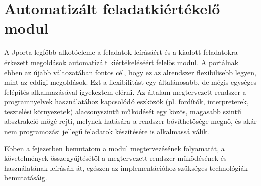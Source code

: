 \chapter{Automatizált feladatkiértékelő modul}\label{chapter:exercise}

A Jporta legfőbb alkotóeleme a feladatok leírásáért és a kiadott feladatokra érkezett megoldások automatizált kiértékeléséért felelős modul.
A portálnak ebben az újabb változatában fontos cél, hogy ez az alrendszer flexibilisebb legyen, mint az eddigi megoldások.
Ezt a flexibilitást egy általánosabb, de mégis egységes felépítés alkalmazásával igyekeztem elérni.
Az általam megtervezett rendszer a programnyelvek használatához kapcsolódó eszközök (pl. fordítók, interpreterek, tesztelési környezetek) alacsonyszintű működését egy közös, magasabb szintű absztrakció mögé rejti, melynek hatására a rendszer bővíthetősége megnő, és akár nem programozási jellegű feladatok készítésére is alkalmassá válik.

Ebben a fejezetben bemutatom a modul megtervezésének folyamatát, a követelmények összegyűjtésétől a megtervezett rendszer működésének és használatának leírásán át, egészen az implementációhoz szükséges technológiák bemutatásáig.

